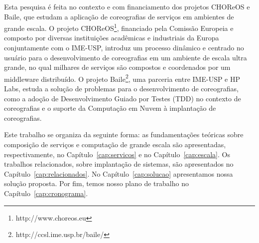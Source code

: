 Esta pesquisa é feita no contexto e com financiamento dos projetos CHOReOS e Baile, que estudam a aplicação de coreografias de serviços em ambientes de grande escala. O projeto CHOReOS\footnote{http://www.choreos.eu}, financiado pela Comissão Europeia e composto por diversas instituições acadêmicas e industriais da Europa conjuntamente com o IME-USP, introduz um processo dinâmico e centrado no usuário para o desenvolvimento de coreografias em um ambiente de escala ultra grande, no qual milhares de serviços são compostos e coordenados por um middleware distribuído. O projeto Baile\footnote{http://ccsl.ime.usp.br/baile/}, uma parceria entre IME-USP e HP Labs, estuda a solução de problemas para o desenvolvimento de coreografias, como a adoção de Desenvolvimento Guiado por Testes (TDD) no contexto de coreografias e o suporte da Computação em Nuvem à implantação de coreografias.

Este trabalho se organiza da seguinte forma: as fundamentações teóricas sobre composição de serviços e computação de grande escala são apresentadas, respectivamente, no Capítulo~\ref{cap:servicos} e no Capítulo~\ref{cap:escala}. Os trabalhos relacionados, sobre implantação de sistemas, são apresentados no Capítulo~\ref{cap:relacionados}. No Capítulo~\ref{cap:solucao} apresentamos nossa solução proposta. Por fim, temos nosso plano de trabalho no Capítulo~\ref{cap:cronograma}. 


%
%
%
%
